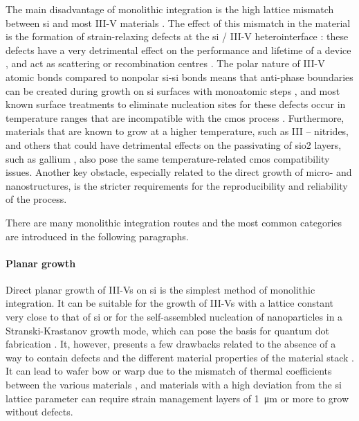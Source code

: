 The main disadvantage of monolithic integration is the high lattice mismatch between \acl{si} and most III-V materials \cite{Kuech2016}. The effect of this mismatch in the material is the formation of strain-relaxing defects at the \acl{si} / III-V heterointerface \cite{Kunert2018}: these defects have a very detrimental effect on the performance and lifetime of a device \cite{Mahajan2000, Zenari2021}, and act as scattering or recombination centres \cite{Jeon2015}. The polar nature of III-V atomic bonds compared to nonpolar \acs{si}-\acs{si} bonds means that anti-phase boundaries can be created during growth on \acl{si} surfaces with monoatomic steps \cite{Kunert2018}, and most known surface treatments to eliminate nucleation sites for these defects occur in temperature ranges that are incompatible with the \acs{cmos} process \cite{Miller2000}. Furthermore, materials that are known to grow at a higher temperature, such as III – nitrides, and others that could have detrimental effects on the passivating of \acf{sio2} layers, such as gallium \cite{Miller2000}, also pose the same temperature-related \acs{cmos} compatibility issues. Another key obstacle, especially related to the direct growth of micro- and nanostructures, is the stricter requirements for the reproducibility and reliability of the process.

There are many monolithic integration routes and the most common categories are introduced in the following paragraphs.

\paragraph{Planar growth} Direct planar growth of III-Vs on \acl{si} is the simplest method of monolithic integration. It can be suitable for the growth of III-Vs with a lattice constant very close to that of \acl{si} or for the self-assembled nucleation of nanoparticles in a Stranski-Krastanov growth mode, which can pose the basis for quantum dot fabrication \cite{Shi2016, Reithmaier2016}. It, however, presents a few drawbacks related to the absence of a way to contain defects and the different material properties of the material stack \cite{Ravash2012}. It can lead to wafer bow or warp due to the mismatch of thermal coefficients between the various materials \cite{Miyoshi2016, Wang2017_2}, and materials with a high deviation from the \acl{si} lattice parameter can require strain management layers of \qty{1}{\micro\metre} or more to grow without defects\cite{Wang2017_2, Cantoro2012}.
\par

